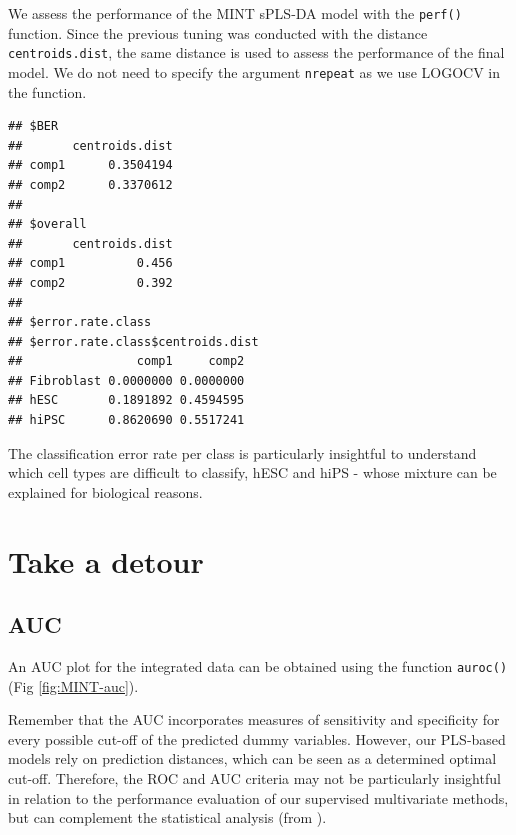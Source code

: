 \documentclass[]{book}
\newenvironment{Shaded}{\begin{snugshade}}{\end{snugshade}}
\newcommand{\KeywordTok}[1]{\textcolor[rgb]{0.13,0.29,0.53}{\textbf{#1}}}
\newcommand{\DataTypeTok}[1]{\textcolor[rgb]{0.13,0.29,0.53}{#1}}
\newcommand{\DecValTok}[1]{\textcolor[rgb]{0.00,0.00,0.81}{#1}}
\newcommand{\StringTok}[1]{\textcolor[rgb]{0.31,0.60,0.02}{#1}}
\newcommand{\CommentTok}[1]{\textcolor[rgb]{0.56,0.35,0.01}{\textit{#1}}}
\newcommand{\OperatorTok}[1]{\textcolor[rgb]{0.81,0.36,0.00}{\textbf{#1}}}
\newcommand{\NormalTok}[1]{#1}
\begin{document}
We assess the performance of the MINT sPLS-DA model with the
\texttt{perf()} function. Since the previous tuning was conducted with
the distance \texttt{centroids.dist}, the same distance is used to
assess the performance of the final model. We do not need to specify the
argument \texttt{nrepeat} as we use LOGOCV in the function.

\begin{Shaded}
\end{Shaded}

\begin{verbatim}
## $BER
##       centroids.dist
## comp1      0.3504194
## comp2      0.3370612
## 
## $overall
##       centroids.dist
## comp1          0.456
## comp2          0.392
## 
## $error.rate.class
## $error.rate.class$centroids.dist
##                comp1     comp2
## Fibroblast 0.0000000 0.0000000
## hESC       0.1891892 0.4594595
## hiPSC      0.8620690 0.5517241
\end{verbatim}

The classification error rate per class is particularly insightful to
understand which cell types are difficult to classify, hESC and hiPS -
whose mixture can be explained for biological reasons.

\section{Take a detour}\label{mint:detour}

\subsection{AUC}\label{auc}

An AUC plot for the integrated data can be obtained using the function
\texttt{auroc()} (Fig \ref{fig:MINT-auc}).

Remember that the AUC incorporates measures of sensitivity and
specificity for every possible cut-off of the predicted dummy variables.
However, our PLS-based models rely on prediction distances, which can be
seen as a determined optimal cut-off. Therefore, the ROC and AUC
criteria may not be particularly insightful in relation to the
performance evaluation of our supervised multivariate methods, but can
complement the statistical analysis (from \citet{Roh17}).
\end{document}
